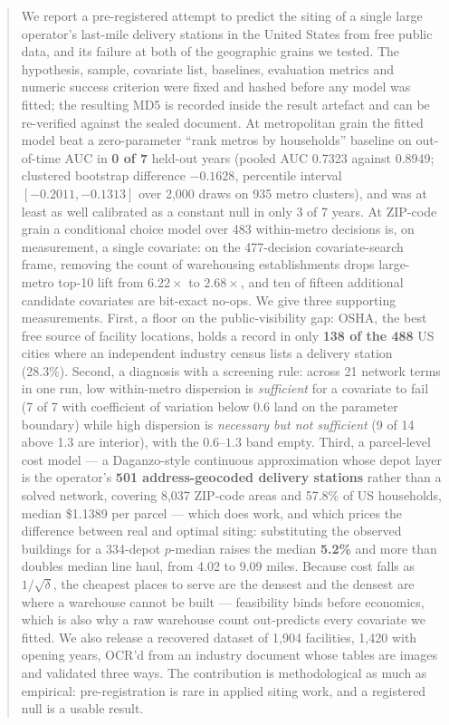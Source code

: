 \documentclass[conference]{IEEEtran}
\begin{document}
\begin{abstract}
We report a pre-registered attempt to predict the siting of a single large
operator's last-mile delivery stations in the United States from free public
data, and its failure at both of the geographic grains we tested. The
hypothesis, sample, covariate list, baselines, evaluation metrics and numeric
success criterion were fixed and hashed before any model was fitted; the
resulting MD5 is recorded inside the result artefact and can be re-verified
against the sealed document. At metropolitan grain the fitted model beat a
zero-parameter ``rank metros by households'' baseline on out-of-time AUC in
\textbf{0 of 7} held-out years (pooled AUC 0.7323 against 0.8949; clustered
bootstrap difference $-0.1628$, percentile interval $[-0.2011, -0.1313]$ over
2{,}000 draws on 935 metro clusters), and was at least as well calibrated as a
constant null in only 3 of 7 years. At ZIP-code grain a conditional choice
model over 483 within-metro decisions is, on measurement, a single covariate:
on the 477-decision covariate-search frame, removing the count of warehousing
establishments drops large-metro top-10 lift from $6.22\times$ to
$2.68\times$, and ten of fifteen additional candidate covariates are bit-exact
no-ops. We give three supporting measurements. First,
a floor on the public-visibility gap: OSHA, the best free source of facility
locations, holds a record in only \textbf{138 of the 488} US cities where an
independent industry census lists a delivery station (28.3\%). Second, a
diagnosis with a screening rule: across 21 network terms in one run, low
within-metro dispersion is \emph{sufficient} for a covariate to fail (7 of 7
with coefficient of variation below 0.6 land on the parameter boundary) while
high dispersion is \emph{necessary but not sufficient} (9 of 14 above 1.3 are
interior), with the $0.6$--$1.3$ band empty. Third, a parcel-level cost model
--- a Daganzo-style continuous approximation whose depot layer is the
operator's \textbf{501 address-geocoded delivery stations} rather than a
solved network, covering 8{,}037 ZIP-code areas and 57.8\% of US households,
median \$1.1389 per parcel --- which does work, and which prices the
difference between real and optimal siting: substituting the observed
buildings for a 334-depot $p$-median raises the median \textbf{5.2\%} and more
than doubles median line haul, from 4.02 to 9.09 miles. Because cost falls as
$1/\sqrt{\delta}$, the cheapest places to serve are the densest and the
densest are where a warehouse cannot be built --- feasibility binds before
economics, which is also why a raw warehouse count out-predicts every
covariate we fitted. We also release a recovered
dataset of 1{,}904 facilities, 1{,}420 with opening years, OCR'd from an
industry document whose tables are images and validated three ways. The
contribution is methodological as much as empirical: pre-registration is rare
in applied siting work, and a registered null is a usable result.
\end{abstract}
\end{document}
